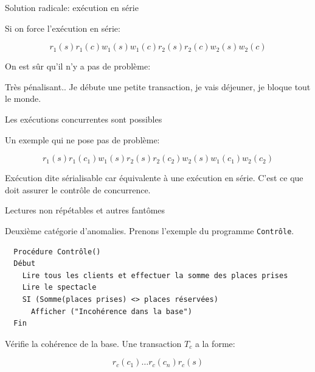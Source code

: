 \begin{frame}{Solution radicale: exécution en série}

Si on force l'exécution en série:

$$r_1(s) r_1(c) w_1(s) w_1(c) r_2(s) r_2(c)  w_2(s) w_2(c)$$

On est sûr qu'il n'y a pas de problème:


\vfill

\begin{blocgauche}
\alert{Très pénalisant.}. Je débute une petite transaction, je vais déjeuner, je bloque
tout le monde.
\end{blocgauche}
\end{frame}



\begin{frame}{Les exécutions concurrentes sont possibles}

Un exemple qui ne pose pas de problème:


$$r_1(s)  r_1(c_1) w_1(s) r_2(s) r_2(c_2) w_2(s) w_1(c_1) w_2(c_2)$$

\vfill



\vfill

\begin{blocgauche}
\alert{Exécution dite sérialisable} car \alert{équivalente} à une exécution  en série.
C'est ce que doit assurer le  contrôle de concurrence.
\end{blocgauche}

\end{frame}

\begin{frame}[fragile]{Lectures non répétables et autres fantômes}

Deuxième catégorie d'anomalies. Prenons l'exemple du programme \texttt{Contrôle}.


\begin{verbatim}
  Procédure Contrôle()
  Début
    Lire tous les clients et effectuer la somme des places prises
    Lire le spectacle 
    SI (Somme(places prises) <> places réservées)
      Afficher ("Incohérence dans la base") 
  Fin
\end{verbatim}

\vfill

Vérifie la cohérence de la base. Une transaction $T_c$ a la forme:

$$r_c(c_1) \ldots r_c(c_n) r_c(s)$$
\end{frame}



